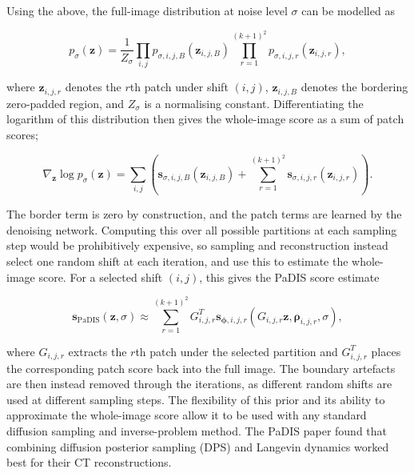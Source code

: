 Using the above, the full-image distribution at noise level $\sigma$ can be modelled as

\begin{equation}
p_\sigma(\mathbf{z})
=
\frac{1}{Z_\sigma}
\prod_{i,j}
p_{\sigma,i,j,B}(\mathbf{z}_{i,j,B})
\prod_{r=1}^{(k+1)^2}
p_{\sigma,i,j,r}(\mathbf{z}_{i,j,r}),
\label{eq:padis_full_image_distribution}
\end{equation}

where $\mathbf{z}_{i,j,r}$ denotes the $r$th patch under shift $(i,j)$, $\mathbf{z}_{i,j,B}$ denotes the bordering zero-padded region, and $Z_\sigma$ is a normalising constant. Differentiating the logarithm of this distribution then gives the whole-image score as a sum of patch scores;

\begin{equation}
\nabla_{\mathbf{z}}\log p_\sigma(\mathbf{z})
=
\sum_{i,j}
\left(
\mathbf{s}_{\sigma,i,j,B}(\mathbf{z}_{i,j,B})
+
\sum_{r=1}^{(k+1)^2}
\mathbf{s}_{\sigma,i,j,r}(\mathbf{z}_{i,j,r})
\right).
\label{eq:padis_whole_image_score_sum}
\end{equation}

The border term is zero by construction, and the patch terms are learned by the denoising network. Computing this over all possible partitions at each sampling step would be prohibitively expensive, so sampling and reconstruction instead select one random shift at each iteration, and use this to estimate the whole-image score. For a selected shift $(i,j)$, this gives the PaDIS score estimate

\begin{equation}
\mathbf{s}_{\mathrm{PaDIS}}(\mathbf{z},\sigma)
\approx
\sum_{r=1}^{(k+1)^2}
G_{i,j,r}^T
\mathbf{s}_{\boldsymbol{\phi},i,j,r}
(G_{i,j,r}\mathbf{z},\boldsymbol{\rho}_{i,j,r},\sigma),
\label{eq:padis_score_estimate}
\end{equation}

where $G_{i,j,r}$ extracts the $r$th patch under the selected partition and $G_{i,j,r}^T$ places the corresponding patch score back into the full image. The boundary artefacts are then instead removed through the iterations, as different random shifts are used at different sampling steps. The flexibility of this prior and its ability to approximate the whole-image score allow it to be used with any standard diffusion sampling and inverse-problem method. The PaDIS paper found that combining diffusion posterior sampling (DPS) and Langevin dynamics worked best for their CT reconstructions.


